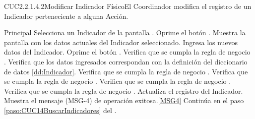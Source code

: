 	\begin{UseCase}{CUC2.2.1.4.2}{Modificar Indicador Físico}{El Coordinador modifica el registro de un Indicador perteneciente a alguna Acción.}
	\end{UseCase}
% 
	\begin{UCtrayectoria}{Principal}
			\UCpaso[\UCactor] Selecciona un Indicador de la pantalla  .
			\UCpaso[\UCactor] Oprime el botón .
			\UCpaso Muestra la pantalla  con los datos actuales del Indicador seleccionado.
			\UCpaso [\UCactor] Ingresa los nuevos datos del Indicador.\label{paso:CUC1.4.2ingresaDatosIndicador}
			\UCpaso [\UCactor] Oprime el botón .
			\UCpaso Verifica que se cumpla la regla de negocio . 
			\UCpaso Verifica que los datos ingresados correspondan  con la definición del diccionario de datos \ref{dd:Indicador}. 
			\UCpaso Verifica que se cumpla la regla de negocio .
			\UCpaso Verifica que se cumpla la regla de negocio .
			\UCpaso Verifica que se cumpla la regla de negocio .
			\UCpaso Verifica que se cumpla la regla de negocio .
			\UCpaso Actualiza el registro del Indicador.
			\UCpaso Muestra el mensaje (MSG-4) de operación exitosa.\ref{MSG4}
			\UCpaso Continúa en el paso \ref{paso:CUC14BuscarIndicadores} del .
	\end{UCtrayectoria}

